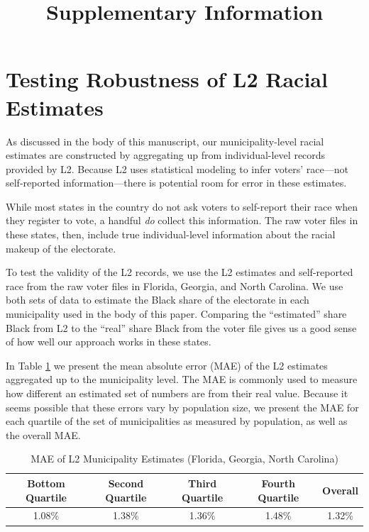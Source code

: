 \documentclass[
  12pt,
]{article}
\title{Supplementary Information}
\author{}
\date{\vspace{-2.5em}}
\begin{document}
\maketitle

{
\setcounter{tocdepth}{2}
\tableofcontents
}
\doublespacing

\hypertarget{testing-robustness-of-l2-racial-estimates}{%
\section*{Testing Robustness of L2 Racial Estimates}\label{testing-robustness-of-l2-racial-estimates}}

As discussed in the body of this manuscript, our municipality-level racial estimates are constructed by aggregating up from individual-level records provided by L2. Because L2 uses statistical modeling to infer voters' race---not self-reported information---there is potential room for error in these estimates.

While most states in the country do not ask voters to self-report their race when they register to vote, a handful \emph{do} collect this information. The raw voter files in these states, then, include true individual-level information about the racial makeup of the electorate.

To test the validity of the L2 records, we use the L2 estimates and self-reported race from the raw voter files in Florida, Georgia, and North Carolina. We use both sets of data to estimate the Black share of the electorate in each municipality used in the body of this paper. Comparing the ``estimated'' share Black from L2 to the ``real'' share Black from the voter file gives us a good sense of how well our approach works in these states.

In Table \ref{tab:mae} we present the mean absolute error (MAE) of the L2 estimates aggregated up to the municipality level. The MAE is commonly used to measure how different an estimated set of numbers are from their real value. Because it seems possible that these errors vary by population size, we present the MAE for each quartile of the set of municipalities as measured by population, as well as the overall MAE.

\begin{singlespace}
\begin{table}[H]

\caption{\label{tab:mae-chunck}\label{tab:mae} MAE of L2 Municipality Estimates (Florida, Georgia, North Carolina)}
\centering
\begin{tabular}[t]{ccccc}
\toprule
Bottom Quartile & Second Quartile & Third Quartile & Fourth Quartile & Overall\\
\midrule
1.08\% & 1.38\% & 1.36\% & 1.48\% & 1.32\%\\
\bottomrule
\end{tabular}
\end{table}
\end{singlespace}
\end{document}
